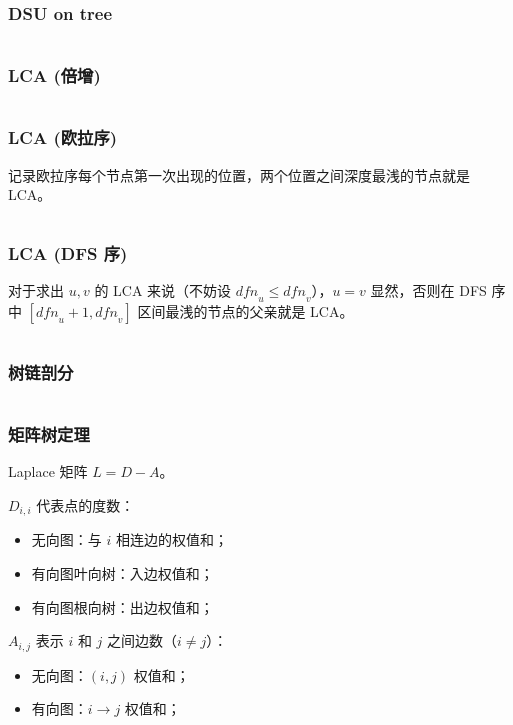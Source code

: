 \documentclass[twoside]{article}
\begin{document}
\subsubsection{DSU on tree} %
\inputminted[breaklines, frame=single]{c++}{../algo/图论/树/dsu_on_tree.cpp}


\subsubsection{LCA (倍增)} %
\inputminted[breaklines, frame=single]{c++}{../algo/图论/树/LCA【倍增】.cpp}


\subsubsection{LCA (欧拉序)} %
记录欧拉序每个节点第一次出现的位置，两个位置之间深度最浅的节点就是 LCA。
\inputminted[breaklines, frame=single]{c++}{../algo/图论/树/LCA【欧拉序】.cpp}


\subsubsection{LCA (DFS 序)} %
对于求出 $u,v$ 的 LCA 来说（不妨设 $\textit{dfn}_u\le \textit{dfn}_v$），$u=v$ 显然，否则在 DFS 序中 $[\textit{dfn}_u+1,\textit{dfn}_v]$ 区间最浅的节点的父亲就是 LCA。
\inputminted[breaklines, frame=single]{c++}{../algo/图论/树/LCA【dfs序】.cpp}



\subsubsection{树链剖分} %
\inputminted[breaklines, frame=single]{c++}{../algo/图论/树/树链剖分【非封装版】.cpp}


\subsubsection{矩阵树定理} %

Laplace 矩阵 $L=D-A$。



\begin{minipage}[t]{0.45\textwidth}
    $D_{i,i}$ 代表点的度数：
    \begin{itemize}[noitemsep, topsep=-5pt]
        \item 无向图：与 $i$ 相连边的权值和；
        \item 有向图叶向树：入边权值和；
        \item 有向图根向树：出边权值和；
    \end{itemize}
\end{minipage}
\hfill
\begin{minipage}[t]{0.45\textwidth}
    $A_{i,j}$ 表示 $i$ 和 $j$ 之间边数（$i\ne j$）：
    \begin{itemize}[noitemsep, topsep=-5pt]
        \item 无向图：$(i,j)$ 权值和；
        \item 有向图：$i\to j$ 权值和；
    \end{itemize}
\end{minipage}
\bigskip
\end{document}
